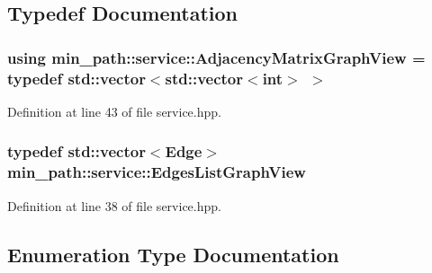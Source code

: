 \subsection{Typedef Documentation}
\subsubsection[{\texorpdfstring{Adjacency\+Matrix\+Graph\+View}{AdjacencyMatrixGraphView}}]{\setlength{\rightskip}{0pt plus 5cm}using {\bf min\+\_\+path\+::service\+::\+Adjacency\+Matrix\+Graph\+View} = typedef std\+::vector$<$std\+::vector$<$int$>$ $>$}\hypertarget{namespacemin__path_1_1service_af657481a4b0a05546de6e9c1023bd9f5}{}\label{namespacemin__path_1_1service_af657481a4b0a05546de6e9c1023bd9f5}


Definition at line 43 of file service.\+hpp.

\subsubsection[{\texorpdfstring{Edges\+List\+Graph\+View}{EdgesListGraphView}}]{\setlength{\rightskip}{0pt plus 5cm}typedef std\+::vector$<${\bf Edge}$>$ {\bf min\+\_\+path\+::service\+::\+Edges\+List\+Graph\+View}}\hypertarget{namespacemin__path_1_1service_aa7134896d837083f384364b56a32bb49}{}\label{namespacemin__path_1_1service_aa7134896d837083f384364b56a32bb49}


Definition at line 38 of file service.\+hpp.



\subsection{Enumeration Type Documentation}
